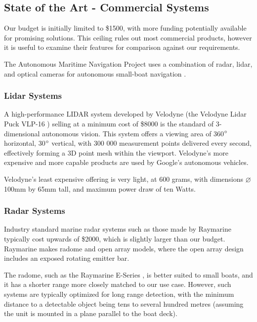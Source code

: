 \subsection{\label{sec:intro:commercial}State of the Art - Commercial Systems}
Our budget is initially limited to \$1500, with more funding potentially available for promising solutions. This ceiling rules out most commercial products, however it is useful to examine their features for comparison against our requirements.

The Autonomous Maritime Navigation Project uses a combination of radar, lidar, and optical cameras for autonomous small-boat navigation \cite{AMN}.


\subsubsection{\label{sec:intro:commercial:lidar}Lidar Systems}
A high-performance LIDAR system developed by Velodyne (the Velodyne Lidar Puck VLP-16 \cite{velodyne-vlp16}) selling at a minimum cost of \$8000 is the standard of 3-dimensional autonomous vision. This system offers a viewing area of 360$\degree$ horizontal, 30$\degree$ vertical, with 300 000 measurement points delivered every second, effectively forming a 3D point mesh within the viewport. Velodyne's more expensive and more capable products are used by Google's autonomous vehicles.

Velodyne's least expensive offering is very light, at 600 grams, with dimensions $\varnothing$100mm by 65mm tall, and maximum power draw of ten Watts.


\subsubsection{\label{sec:intro:commercial:radar}Radar Systems}
Industry standard marine radar systems such as those made by Raymarine typically cost upwards of \$2000, which is slightly larger than our budget. Raymarine makes radome and open array models, where the open array design includes an exposed rotating emitter bar.

The radome, such as the Raymarine E-Series \cite{raymarine-eseries}, is better suited to small boats, and it has a shorter range more closely matched to our use case. However, such systems are typically optimized for long range detection, with the minimum distance to a detectable object being tens to several hundred metres (assuming the unit is mounted in a plane parallel to the boat deck).


